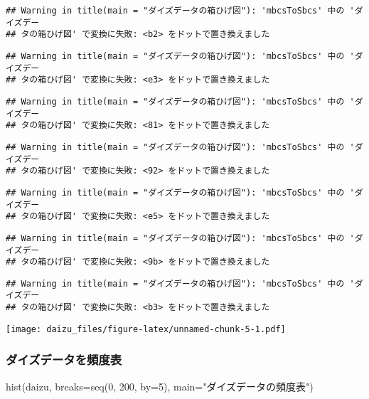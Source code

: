\documentclass[
]{article}
\newenvironment{Shaded}{\begin{snugshade}}{\end{snugshade}}
\newcommand{\AttributeTok}[1]{\textcolor[rgb]{0.77,0.63,0.00}{#1}}
\newcommand{\DecValTok}[1]{\textcolor[rgb]{0.00,0.00,0.81}{#1}}
\newcommand{\FunctionTok}[1]{\textcolor[rgb]{0.00,0.00,0.00}{#1}}
\newcommand{\NormalTok}[1]{#1}
\newcommand{\StringTok}[1]{\textcolor[rgb]{0.31,0.60,0.02}{#1}}
\begin{document}
\begin{verbatim}
## Warning in title(main = "ダイズデータの箱ひげ図"): 'mbcsToSbcs' 中の 'ダイズデー
## タの箱ひげ図' で変換に失敗: <b2> をドットで置き換えました
\end{verbatim}

\begin{verbatim}
## Warning in title(main = "ダイズデータの箱ひげ図"): 'mbcsToSbcs' 中の 'ダイズデー
## タの箱ひげ図' で変換に失敗: <e3> をドットで置き換えました
\end{verbatim}

\begin{verbatim}
## Warning in title(main = "ダイズデータの箱ひげ図"): 'mbcsToSbcs' 中の 'ダイズデー
## タの箱ひげ図' で変換に失敗: <81> をドットで置き換えました
\end{verbatim}

\begin{verbatim}
## Warning in title(main = "ダイズデータの箱ひげ図"): 'mbcsToSbcs' 中の 'ダイズデー
## タの箱ひげ図' で変換に失敗: <92> をドットで置き換えました
\end{verbatim}

\begin{verbatim}
## Warning in title(main = "ダイズデータの箱ひげ図"): 'mbcsToSbcs' 中の 'ダイズデー
## タの箱ひげ図' で変換に失敗: <e5> をドットで置き換えました
\end{verbatim}

\begin{verbatim}
## Warning in title(main = "ダイズデータの箱ひげ図"): 'mbcsToSbcs' 中の 'ダイズデー
## タの箱ひげ図' で変換に失敗: <9b> をドットで置き換えました
\end{verbatim}

\begin{verbatim}
## Warning in title(main = "ダイズデータの箱ひげ図"): 'mbcsToSbcs' 中の 'ダイズデー
## タの箱ひげ図' で変換に失敗: <b3> をドットで置き換えました
\end{verbatim}

\texttt{[image: daizu\_files/figure-latex/unnamed-chunk-5-1.pdf]}

\hypertarget{ux30c0ux30a4ux30baux30c7ux30fcux30bfux3092ux983bux5ea6ux8868}{%
\subsubsection{ダイズデータを頻度表}\label{ux30c0ux30a4ux30baux30c7ux30fcux30bfux3092ux983bux5ea6ux8868}}

\begin{Shaded}
\begin{Highlighting}[]
    \FunctionTok{hist}\NormalTok{(daizu, }\AttributeTok{breaks=}\FunctionTok{seq}\NormalTok{(}\DecValTok{0}\NormalTok{, }\DecValTok{200}\NormalTok{, }\AttributeTok{by=}\DecValTok{5}\NormalTok{), }\AttributeTok{main=}\StringTok{"ダイズデータの頻度表"}\NormalTok{)}
\end{Highlighting}
\end{Shaded}
\end{document}
